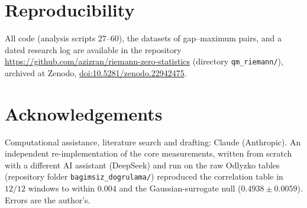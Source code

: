 \documentclass[12pt]{amsart}
\begin{document}
\section*{Reproducibility}

All code (analysis scripts 27--60), the datasets of gap--maximum pairs,
and a dated research log are available in the repository
\url{https://github.com/azizran/riemann-zero-statistics} (directory
\texttt{qm\_riemann/}), archived at Zenodo,
\href{https://doi.org/10.5281/zenodo.22942475}{doi:10.5281/zenodo.22942475}.

\section*{Acknowledgements}

Computational assistance, literature search and drafting: Claude
(Anthropic). An independent re-implementation of the core measurements, written from scratch with a different AI assistant (DeepSeek) and run on the raw Odlyzko tables (repository folder \texttt{bagimsiz\_\allowbreak dogrulama/}) reproduced the correlation table in
$12/12$ windows to within $0.004$ and the Gaussian-surrogate null
($0.4938 \pm 0.0059$). Errors are the author's.
\end{document}
